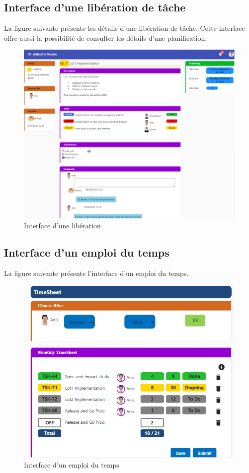 \subsection{	Interface d’une libération de tâche}
\hspace{4mm}La figure suivante présente les détails d’une libération de tâche. Cette interface offre aussi la possibilité de consulter les détails d’une planification.
\begin{figure}[h]
    \centering
    \includegraphics{figures/33anis28.png}
    \caption{Interface d’une libération}
    \label{fig:interface_liberation}
\end{figure}\newpage
\subsection{	Interface d'un emploi du temps  }
\hspace{4mm}La figure suivante présente l’interface d'un emploi du temps.
\begin{figure}[h]
    \centering
    \includegraphics[scale=0.5]{figures/3333anis7.png}
    \caption{Interface d'un emploi du temps}
    \label{fig:interface_timesheet}
\end{figure}
